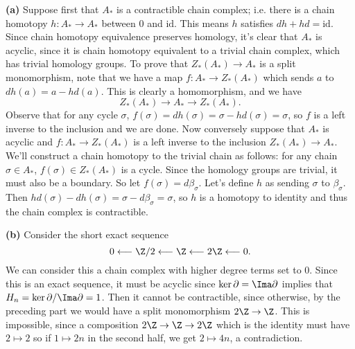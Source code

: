 \documentclass[11pt,letterpaper]{article}
\begin{document}
\begin{solution}
    \textbf{(a)} Suppose first that $A_*$ is a contractible chain complex; i.e. there is a chain homotopy $h : A_* \to A_*$ between $0$ and $\text{id}$. This means $h$ satisfies $dh+hd=\text{id}$. Since chain homotopy equivalence preserves homology, it's clear that $A_*$ is acyclic, since it is chain homotopy equivalent to a trivial chain complex, which has trivial homology groups. To prove that $Z_*(A_*) \to A_*$ is a split monomorphism, note that we have a map $f : A_* \to Z_*(A_*)$ which sends $a$ to $dh(a)=a-hd(a)$. This is clearly a homomorphism, and we have
    \[
        Z_*(A_*) \longrightarrow A_* \longrightarrow Z_*(A_*)
    .\]   
    Observe that for any cycle $\sigma$, $f(\sigma)=dh(\sigma)=\sigma-hd(\sigma)=\sigma$, so $f$ is a left inverse to the inclusion and we are done. Now conversely suppose that $A_*$ is acyclic and $f : A_* \to Z_*(A_*)$ is a left inverse to the inclusion $Z_*(A_*) \to A_*$. We'll construct a chain homotopy to the trivial chain as follows: for any chain $\sigma\in A_*$, $f(\sigma)\in Z_*(A_*)$ is a cycle. Since the homology groups are trivial, it must also be a boundary. So let $f(\sigma)=d\beta_\sigma$. Let's define $h$ as sending $\sigma$ to $\beta_\sigma$. Then $hd(\sigma)-dh(\sigma)=\sigma -d\beta_\sigma=\sigma$, so $h$ is a homotopy to identity and thus the chain complex is contractible.  
    
    \textbf{(b)} Consider the short exact sequence 
    \[
        0 \longleftarrow \Z /2 \longleftarrow \Z \longleftarrow 2\Z \longleftarrow 0
    .\] 
    We can consider this a chain complex with higher degree terms set to 0. Since this is an exact sequence, it must be acyclic since $\ker \partial = \Ima \partial$ implies that $H_n = \ker \partial / \Ima \partial = 1$. Then it cannot be contractible, since otherwise, by the preceding part we would have a split monomorphism $2\Z \to \Z$. This is impossible, since a composition $2\Z \to \Z \to 2\Z$ which is the identity must have $2\mapsto 2$ so if $1\mapsto 2n$ in the second half, we get $2\mapsto 4n$, a contradiction. 
\end{solution}
\end{document}
